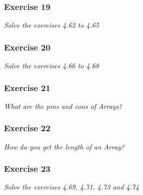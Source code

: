 \subsubsection*{Exercise 19}
\textit{Solve the exercises 4.62 to 4.65}\\

\subsubsection*{Exercise 20}
\textit{Solve the exercises 4.66 to 4.68}\\

\subsubsection*{Exercise 21}
\textit{What are the pros and cons of Arrays?}\\

\subsubsection*{Exercise 22}
\textit{How do you get the length of an Array?}\\

\subsubsection*{Exercise 23}
\textit{Solve the exercises 4.69, 4.71, 4.73 and 4.74}\\




